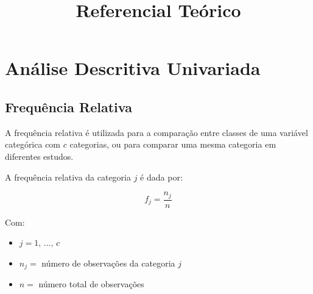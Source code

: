 \documentclass[
]{estat/estat}
\title{Referencial Teórico}
\author{}
\date{}
\renewcommand*\contentsname{Índice}
\newcommand\contentsname{Índice}
\begin{document}
\maketitle
\fancyhf{} 

\fancyhead[L]{} %
\renewcommand{\headrulewidth}{0pt}   %

\fancyfoot[R]{\textcolor{white}{\thepage}} %

\pagestyle{fancy} 

\ifdefined\Shaded\renewenvironment{Shaded}{\begin{tcolorbox}[borderline west={3pt}{0pt}{shadecolor}, breakable, boxrule=0pt, interior hidden, enhanced, sharp corners, frame hidden]}{\end{tcolorbox}}\fi

\renewcommand*\contentsname{Sumário}
{
\hypersetup{linkcolor=}
\setcounter{tocdepth}{3}
\tableofcontents
}
\hypertarget{anuxe1lise-descritiva-univariada}{%
\section{Análise Descritiva
Univariada}\label{anuxe1lise-descritiva-univariada}}

\hypertarget{frequuxeancia-relativa}{%
\subsection{Frequência Relativa}\label{frequuxeancia-relativa}}

A frequência relativa é utilizada para a comparação entre classes de uma
variável categórica com \(c\) categorias, ou para comparar uma mesma
categoria em diferentes estudos.

A frequência relativa da categoria \(j\) é dada por:

\[
f_j=\frac{n_j}{n}
\]

Com:

\begin{itemize}
\item
  \(j = 1, \, ..., \, c\)
\item
  \(n_j =\) número de observações da categoria \(j\)
\item
  \(n =\) número total de observações
\end{itemize}
\end{document}
